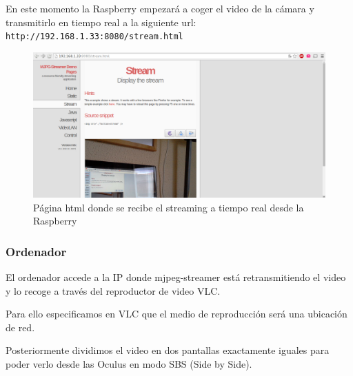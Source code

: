 \documentclass[twoside, 12pt]{epstfg}
\begin{document}
En este momento la Raspberry empezará a coger el video de la cámara y transmitirlo en tiempo real a la siguiente url: \texttt{http://192.168.1.33:8080/stream.html}

\begin{figure}[h!]
	\centerline{
		\mbox{\includegraphics[width=.80\textwidth]{images/pagStream.png}}
	}
	\caption{Página html donde se recibe el streaming a tiempo real desde la Raspberry }
\end{figure}



\newpage
\subsubsection{Ordenador}
El ordenador accede a la IP donde mjpeg-streamer está retransmitiendo el video y lo recoge a través del reproductor de video VLC.

Para ello especificamos en VLC que el medio de reproducción será una ubicación de red.

Posteriormente dividimos el video en dos pantallas exactamente iguales para poder verlo desde las Oculus en modo SBS (Side by Side).
\end{document}
